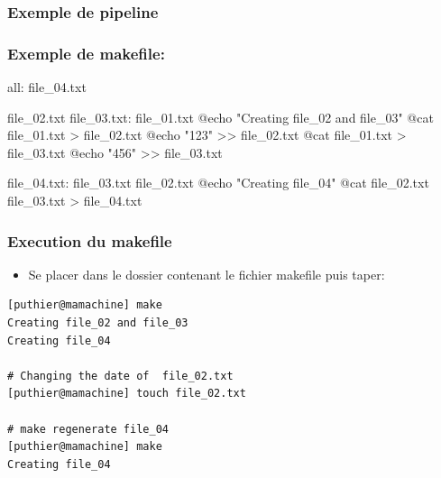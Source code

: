 \documentclass[10pt, xcolor=dvipsnames]{beamer}
\begin{document}
\begin{frame}
    \frametitle{Exemple de pipeline}

\end{frame}

\begin{frame}[fragile]
    \frametitle{Exemple de makefile:}
\tiny
    \begin{verbatimtab}[4] 

all: file_04.txt

file_02.txt file_03.txt: file_01.txt
	@echo "Creating file_02 and file_03"
	@cat file_01.txt > file_02.txt
	@echo "123" >> file_02.txt
	@cat file_01.txt > file_03.txt
	@echo "456" >> file_03.txt


file_04.txt: file_03.txt file_02.txt
	@echo "Creating file_04"
	@cat file_02.txt file_03.txt > file_04.txt

    \end{verbatimtab}

\normalsize
\end{frame}

\begin{frame}[fragile]
    \frametitle{Execution du makefile}
    \begin{scriptsize}
       \begin{itemize}
        \item Se placer dans le dossier contenant le fichier makefile puis taper:
       \end{itemize}
   
    \begin{verbatim}
[puthier@mamachine] make 
Creating file_02 and file_03
Creating file_04

# Changing the date of  file_02.txt
[puthier@mamachine] touch file_02.txt

# make regenerate file_04
[puthier@mamachine] make
Creating file_04
    \end{verbatim}

     \end{scriptsize}
\end{frame}
\end{document}
